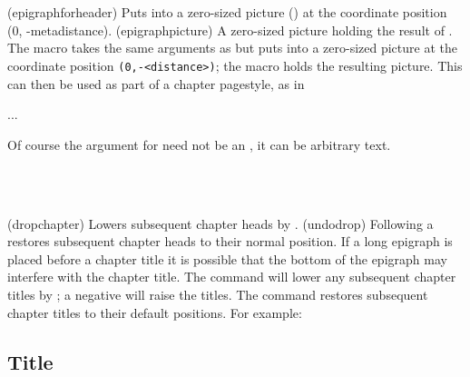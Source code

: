 \begin{syntax}
\cmd{\epigraphforheader} \\
\cmd{\epigraphpicture} \\
\end{syntax}
\glossary(epigraphforheader)%
  {}%
  {Puts  into a zero-sized picture ()
   at the coordinate position (0, -meta{distance}).}
\glossary(epigraphpicture)%
  {}%
  {A zero-sized picture holding the result of .}
The \cmd{\epigraphforheader} macro takes the same arguments as
\cmd{\epigraphhead} but puts  into a zero-sized picture at
the coordinate position \verb?(0,-<distance>)?; the macro 
\cmd{\epigraphpicture}
holds the resulting picture. This can then be used as part of a 
chapter pagestyle, as in
\begin{lcode}
...
\end{lcode}
    Of course the  argument for  need not
be an , it can be arbitrary text.

\begin{syntax}
 \cmd{\dropchapter} \\
 \cmd{\undodrop} \\
\end{syntax}
\glossary(dropchapter)%
  {}%
  {Lowers subsequent chapter heads by .}
\glossary(undodrop)%
  {}%
  {Following a  restores subsequent chapter heads to their 
   normal position.}
 If a long epigraph is placed before a chapter title it is possible that the
 bottom of the epigraph may interfere with the chapter title. The command
 \cmd{\dropchapter} will lower any subsequent chapter titles by 
 ; a negative  will raise the titles.
 The command \cmd{\undodrop} restores subsequent chapter titles to their default
 positions. For example:
 \begin{lcode}
 \dropchapter{2in}
 \chapter{Title}
 \undodrop
 \end{lcode}


